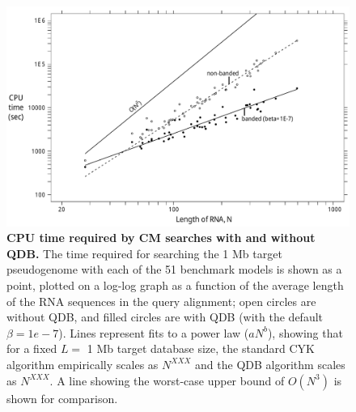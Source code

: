 \begin{figure}
\begin{center}
\includegraphics[width=6.4in]{figs/speedup_fit}
\caption{\textbf{CPU time required by CM searches with and without
    QDB.} The time required for searching the 1 Mb target pseudogenome
    with each of the 51 benchmark models is shown as a point, plotted
    on a log-log graph as a function of the average length of the RNA
    sequences in the query alignment; open circles are without QDB,
    and filled circles are with QDB (with the default $\beta =
    1e-7$). Lines represent fits to a power law ($aN^b$), showing that
    for a fixed $L=$ 1 Mb target database size, the standard CYK
    algorithm empirically scales as $N^{XXX}$ and the QDB algorithm
    scales as $N^{XXX}$. A line showing the worst-case upper bound of
    $O(N^3)$ is shown for comparison. }
\label{fig:speedup}
\end{center}
\end{figure}
